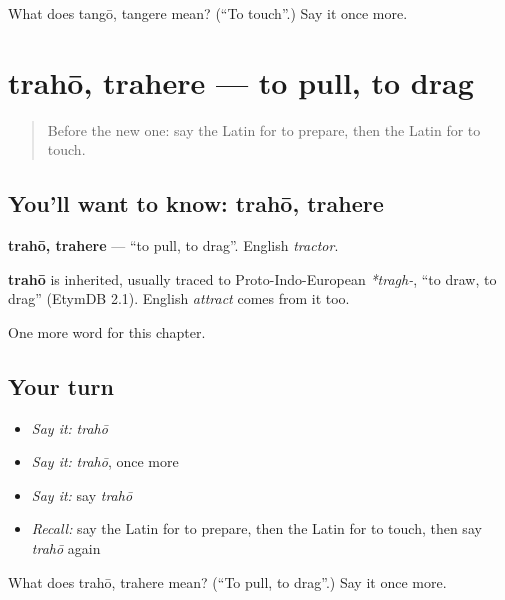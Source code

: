 \begin{tcolorbox}[breakable,colback=teal!4,colframe=teal!35!black,title={Before you move on}]
What does tangō, tangere mean? (\textquotedblleft{}To touch\textquotedblright{}.) Say it once more.
\end{tcolorbox}
\section[trahō, trahere]{trahō, trahere — to pull, to drag}

\label{lesson:LA-C100-traho}



\begin{quote}
Before the new one: say the Latin for to prepare, then the Latin for to touch.
\end{quote}

\subsection*{You'll want to know: trahō, trahere}
\textbf{trahō, trahere} — \textquotedblleft{}to pull, to drag\textquotedblright{}. English \emph{tractor}.

\begin{cousinweb}
\textbf{trahō} is inherited, usually traced to Proto-Indo-European \emph{*tragh-}, \textquotedblleft{}to draw, to drag\textquotedblright{} (EtymDB 2.1). English \emph{attract} comes from it too.
\end{cousinweb}

\begin{grammarlens}[title={What you've built}]
One more word for this chapter.
\end{grammarlens}

\subsection*{Your turn}
\begin{itemize}
\raggedright
  \item \emph{Say it:} \emph{trahō}
  \item \emph{Say it:} \emph{trahō}, once more
  \item \emph{Say it:} say \emph{trahō}
  \item \emph{Recall:} say the Latin for to prepare, then the Latin for to touch, then say \emph{trahō} again
\end{itemize}

\begin{tcolorbox}[breakable,colback=teal!4,colframe=teal!35!black,title={Before you move on}]
What does trahō, trahere mean? (\textquotedblleft{}To pull, to drag\textquotedblright{}.) Say it once more.
\end{tcolorbox}
